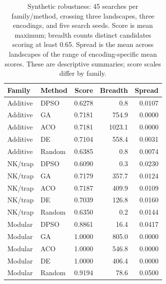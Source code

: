 \begin{table}[t]
\centering
\caption{Synthetic robustness: 45 searches per family/method, crossing three landscapes, three encodings, and five search seeds. Score is mean maximum; breadth counts distinct candidates scoring at least 0.65. Spread is the mean across landscapes of the range of encoding-specific mean scores. These are descriptive summaries; score scales differ by family.}
\label{tab:synthetic-robustness}
\small
\begin{tabular}{llrrr}
\toprule
Family & Method & Score & Breadth & Spread \\
\midrule
Additive & DPSO & 0.6278 & 0.8 & 0.0107 \\
Additive & GA & 0.7181 & 754.9 & 0.0000 \\
Additive & ACO & 0.7181 & 1023.1 & 0.0000 \\
Additive & DE & 0.7104 & 558.4 & 0.0031 \\
Additive & Random & 0.6385 & 0.8 & 0.0074 \\
NK/trap & DPSO & 0.6090 & 0.3 & 0.0230 \\
NK/trap & GA & 0.7179 & 357.7 & 0.0124 \\
NK/trap & ACO & 0.7187 & 409.9 & 0.0109 \\
NK/trap & DE & 0.7039 & 126.8 & 0.0160 \\
NK/trap & Random & 0.6350 & 0.2 & 0.0144 \\
Modular & DPSO & 0.8861 & 16.4 & 0.0417 \\
Modular & GA & 1.0000 & 805.0 & 0.0000 \\
Modular & ACO & 1.0000 & 546.8 & 0.0000 \\
Modular & DE & 1.0000 & 406.4 & 0.0000 \\
Modular & Random & 0.9194 & 78.6 & 0.0500 \\
\bottomrule
\end{tabular}
\end{table}
